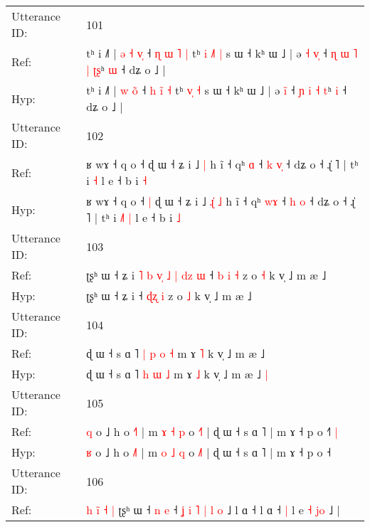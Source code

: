 \documentclass[10pt]{article}
\DeclareRobustCommand{\hl}[1]{{\textcolor{red}{#1}}}
\begin{document}
\begin{longtable}{ll}
 \\
\midrule
Utterance ID: & 101 \\
Ref: & tʰ i ˩˥ |\hl{ }\hl{ə} \hl{˧} \hl{v}\hl{̩} ˧ \hl{ɳ} \hl{ɯ}\hl{ }\hl{˥} \hl{|} tʰ\hl{ }\hl{i} \hl{˩}\hl{˥} \hl{|} s ɯ ˧ kʰ ɯ ˩ | ə\hl{ }\hl{˧} \hl{v}\hl{̩} ˧\hl{ }\hl{ɳ} \hl{ɯ} \hl{˥} \hl{|} \hl{ʈ}\hl{ʂ}ʰ \hl{ɯ} ˧ dʑ o ˩ |
 \\
Hyp: & tʰ i ˩˥ |\hl{}\hl{} \hl{w} \hl{o}\hl{̃} ˧ \hl{h} \hl{}\hl{i}\hl{̃} \hl{˧} tʰ\hl{}\hl{} \hl{v}\hl{̩} \hl{˧} s ɯ ˧ kʰ ɯ ˩ | ə\hl{}\hl{} \hl{i}\hl{̃} ˧\hl{}\hl{} \hl{ɲ} \hl{i} \hl{˧} \hl{}\hl{t}ʰ \hl{i} ˧ dʑ o ˩ |
 \\
\midrule
Utterance ID: & 102 \\
Ref: & ʁ wɤ ˧ q o ˧\hl{}\hl{} ɖ ɯ ˧ ʑ i ˩\hl{}\hl{}\hl{} \hl{|} h ĩ ˧ qʰ \hl{}\hl{ɑ} ˧ \hl{k} \hl{v}\hl{̩} ˧ dʑ o ˧ ɻ̍ ˥ | tʰ i\hl{}\hl{}\hl{} \hl{˧} l e ˧ b i \hl{˧}
 \\
Hyp: & ʁ wɤ ˧ q o ˧\hl{ }\hl{|} ɖ ɯ ˧ ʑ i ˩\hl{ }\hl{ɻ}\hl{̍} \hl{˩} h ĩ ˧ qʰ \hl{w}\hl{ɤ} ˧ \hl{h} \hl{}\hl{o} ˧ dʑ o ˧ ɻ̍ ˥ | tʰ i\hl{ }\hl{˩}\hl{˥} \hl{|} l e ˧ b i \hl{˩}
 \\
\midrule
Utterance ID: & 103 \\
Ref: & ʈʂʰ ɯ ˧ ʑ i\hl{ }\hl{˥}\hl{ }\hl{b}\hl{ }\hl{v}\hl{̩}\hl{ }\hl{˩}\hl{ }\hl{|}\hl{ }\hl{d}\hl{z}\hl{ }\hl{ɯ} ˧ \hl{b}\hl{ }\hl{i} \hl{˧} z o \hl{˧} k v̩ ˩ m æ ˩
 \\
Hyp: & ʈʂʰ ɯ ˧ ʑ i\hl{}\hl{}\hl{}\hl{}\hl{}\hl{}\hl{}\hl{}\hl{}\hl{}\hl{}\hl{}\hl{}\hl{}\hl{}\hl{} ˧ \hl{}\hl{ɖ}\hl{ʐ} \hl{i} z o \hl{˩} k v̩ ˩ m æ ˩
 \\
\midrule
Utterance ID: & 104 \\
Ref: & ɖ ɯ ˧ s ɑ ˥\hl{ }\hl{|} \hl{p} \hl{o} \hl{˧} m ɤ \hl{˥} k v̩ ˩ m æ ˩\hl{}\hl{}
 \\
Hyp: & ɖ ɯ ˧ s ɑ ˥\hl{}\hl{} \hl{h} \hl{ɯ} \hl{˩} m ɤ \hl{˩} k v̩ ˩ m æ ˩\hl{ }\hl{|}
 \\
\midrule
Utterance ID: & 105 \\
Ref: & \hl{q} o ˩ h o \hl{˧}˥ | m \hl{ɤ} \hl{˧} \hl{p} o \hl{˧}˥ | ɖ ɯ ˧ s ɑ ˥ | m ɤ ˧ p o ˧\hl{˥}\hl{ }\hl{|}
 \\
Hyp: & \hl{ʁ} o ˩ h o \hl{˩}˥ | m \hl{o} \hl{˩} \hl{q} o \hl{˩}˥ | ɖ ɯ ˧ s ɑ ˥ | m ɤ ˧ p o ˧\hl{}\hl{}\hl{}
 \\
\midrule
Utterance ID: & 106 \\
Ref: & \hl{h}\hl{ }\hl{i}\hl{̃}\hl{ }\hl{˧}\hl{ }\hl{|} ʈʂʰ ɯ ˧ \hl{n} \hl{e} ˧\hl{ }\hl{ʝ}\hl{ }\hl{i}\hl{ }\hl{˥} \hl{|} \hl{l}\hl{ }\hl{o} ˩ l ɑ ˧ l ɑ ˧\hl{ }\hl{|} l e \hl{˧}\hl{ }\hl{j}\hl{o} ˩ |

\end{longtable}
\end{document}
